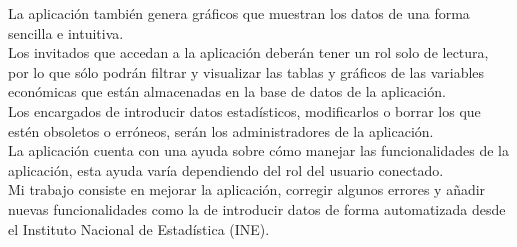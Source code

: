 La aplicación también genera gráficos que muestran los datos de una forma sencilla e intuitiva.\\
Los invitados que accedan a la aplicación deberán tener un rol solo de lectura, por lo que sólo podrán filtrar y visualizar las tablas y gráficos de las variables económicas que están almacenadas en la base de datos de la aplicación.\\
Los encargados de introducir datos estadísticos, modificarlos o borrar los que estén obsoletos o erróneos, serán los administradores de la aplicación.\\
La aplicación cuenta con una ayuda sobre cómo manejar las funcionalidades de la aplicación, esta ayuda varía dependiendo del rol del usuario conectado.\\
Mi trabajo consiste en mejorar la aplicación, corregir algunos errores y añadir nuevas funcionalidades como la de introducir datos de forma automatizada desde el Instituto Nacional de Estadística (INE).\\


